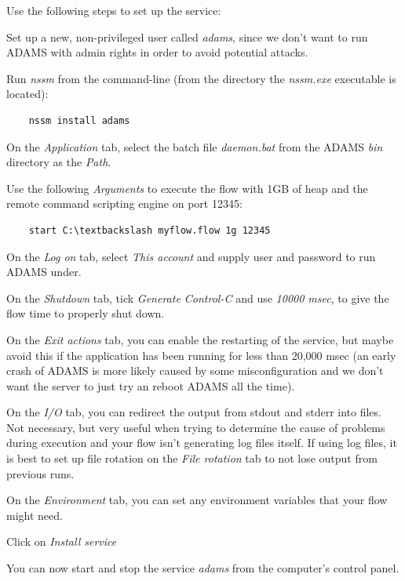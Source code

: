 \noindent Use the following steps to set up the service:
\begin{tight_itemize}
  \item Set up a new, non-privileged user called \textit{adams}, since we
  don't want to run ADAMS with admin rights in order to avoid potential attacks.
  \item Run \textit{nssm} from the command-line (from the directory the
  \textit{nssm.exe} executable is located):
    \begin{verbatim}
    nssm install adams
    \end{verbatim}
  \item On the \textit{Application} tab, select the batch file \textit{daemon.bat}
  from the ADAMS \textit{bin} directory as the \textit{Path}.
  \item Use the following \textit{Arguments} to execute the flow with 1GB of
  heap and the remote command scripting engine on port 12345:
    \begin{verbatim}
    start C:\textbackslash myflow.flow 1g 12345
    \end{verbatim}
  \item On the \textit{Log on} tab, select \textit{This account} and supply user
  and password to run ADAMS under.
  \item On the \textit{Shutdown} tab, tick \textit{Generate Control-C} and use
  \textit{10000 msec}, to give the flow time to properly shut down.
  \item On the \textit{Exit actions} tab, you can enable the restarting of the
  service, but maybe avoid this if the application has been running for less
  than 20,000 msec (an early crash of ADAMS is more likely caused by some
  misconfiguration and we don't want the server to just try an reboot ADAMS all
  the time).
  \item On the \textit{I/O} tab, you can redirect the output from stdout and
  stderr into files. Not necessary, but very useful when trying to determine
  the cause of problems during execution and your flow isn't generating log
  files itself. If using log files, it is best to set up file rotation on the
  \textit{File rotation} tab to not lose output from previous runs.
  \item On the \textit{Environment} tab, you can set any environment variables
  that your flow might need.
  \item Click on \textit{Install service}
\end{tight_itemize}
You can now start and stop the service \textit{adams} from the computer's
control panel.

